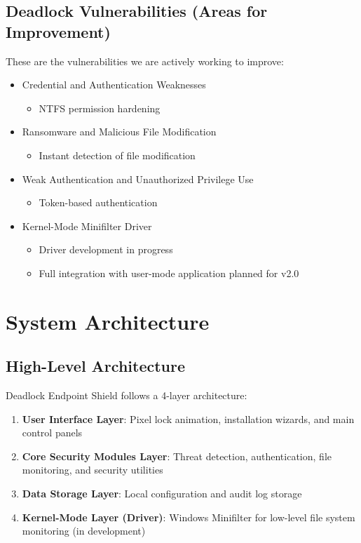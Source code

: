 \documentclass[12pt,letterpaper]{report}
\begin{document}
\section{Deadlock Vulnerabilities (Areas for Improvement)}
These are the vulnerabilities we are actively working to improve:
\begin{itemize}
    \item Credential and Authentication Weaknesses
          \begin{itemize}
              \item NTFS permission hardening
          \end{itemize}
    \item Ransomware and Malicious File Modification
          \begin{itemize}
              \item Instant detection of file modification
          \end{itemize}
    \item Weak Authentication and Unauthorized Privilege Use
          \begin{itemize}
              \item Token-based authentication
          \end{itemize}
    \item Kernel-Mode Minifilter Driver
          \begin{itemize}
              \item Driver development in progress
              \item Full integration with user-mode application planned for v2.0
          \end{itemize}
\end{itemize}

\chapter{System Architecture}
\section{High-Level Architecture}
Deadlock Endpoint Shield follows a 4-layer architecture:
\begin{enumerate}[label=\textbf{Layer \arabic*:}]
    \item \textbf{User Interface Layer}: Pixel lock animation, installation wizards, and main control panels
    \item \textbf{Core Security Modules Layer}: Threat detection, authentication, file monitoring, and security utilities
    \item \textbf{Data Storage Layer}: Local configuration and audit log storage
    \item \textbf{Kernel-Mode Layer (Driver)}: Windows Minifilter for low-level file system monitoring (in development)
\end{enumerate}
\end{document}
